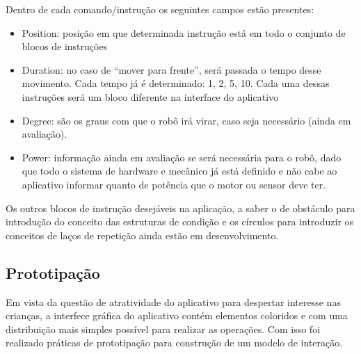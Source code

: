 Dentro de cada comando/instrução os seguintes campos estão presentes:
\begin{itemize}
\item Position: posição em que determinada instrução está em todo o conjunto de blocos de instruções
\item Duration: no caso de “mover para frente”, será passada o tempo desse movimento. Cada tempo já é determinado: 1, 2, 5, 10. Cada uma dessas instruções será um bloco diferente na interface do aplicativo
\item Degree: são os graus com que o robô irá virar, caso seja necessário (ainda em avaliação).
\item Power: informação ainda em avaliação se será necessária para o robô, dado que todo o sistema de hardware e mecânico já está definido e não cabe ao aplicativo informar quanto de potência que o motor ou sensor deve ter.
\end{itemize}

Os outros blocos de instrução desejáveis na aplicação, a saber o de obstáculo para introdução do conceito das estruturas de condição e os círculos para introduzir os conceitos de laços de repetição ainda estão em desenvolvimento.

\subsection{Prototipação}

Em vista da questão de atratividade do aplicativo para despertar interesse nas crianças, a interfece gráfica do aplicativo contém elementos
coloridos e com uma distribuição mais simples possível para realizar as operações. Com isso foi realizado práticas de prototipação para construção
de um modelo de interação.
